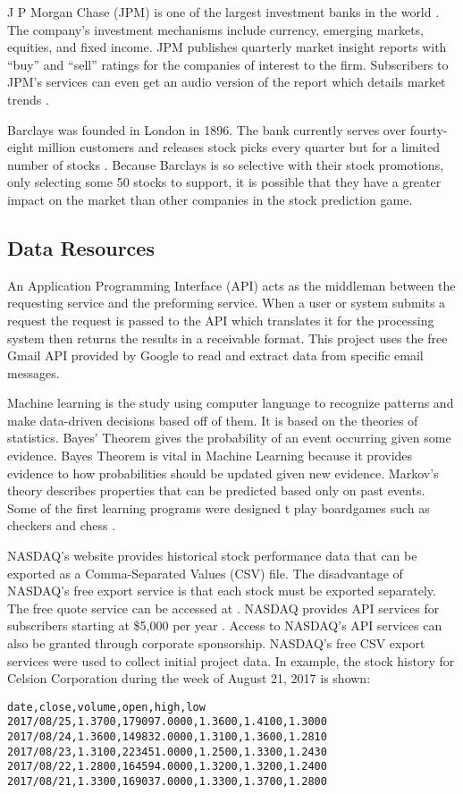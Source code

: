 \documentclass[sigconf]{acmart}
\begin{document}
J P Morgan Chase (JPM) is one of the largest investment banks in the world \cite{www-investBanks}. The company's investment mechanisms include currency, emerging markets, equities, and fixed income. JPM publishes quarterly market insight reports with ``buy'' and ``sell'' ratings for the companies of interest to the firm. Subscribers to JPM's services can even get an audio version of the report which details market trends \cite{www-JPM}.

Barclays was founded in London in 1896. The bank currently serves over fourty-eight million customers and releases stock picks every quarter but for a limited number of stocks \cite{www-investBanks}. Because Barclays is so selective with their stock promotions, only selecting some 50 stocks to support, it is possible that they have a greater impact on the market than other companies in the stock prediction game. 

\subsection{Data Resources}
An Application Programming Interface (API) acts as the middleman between the requesting service and the preforming service. When a user or system submits a request the request is passed to the API which translates it for the processing system then returns the results in a receivable format. This project uses the free Gmail API provided by Google to read and extract data from specific email messages.

Machine learning is the study using computer language to recognize patterns and make data-driven decisions based off of them. It is based on the theories of statistics. Bayes' Theorem gives the probability of an event occurring given some evidence. Bayes Theorem is vital in Machine Learning because it provides evidence to how probabilities should be updated given new evidence. Markov's theory describes properties that can be predicted based only on past events. Some of the first learning programs were designed t play boardgames such as checkers and chess \cite{www-wikiMachine}.

NASDAQ's website provides historical stock performance data that can be exported as a Comma-Separated Values (CSV) file. The disadvantage of NASDAQ's free export service is that each stock must be exported separately. The free quote service can be accessed at \cite{www-quotenasdaq}. NASDAQ provides API services for subscribers starting at \$5,000 per year \cite{www-nasdaq-sub}. Access to NASDAQ's API services can also be granted through corporate sponsorship. NASDAQ's free CSV export services were used to collect initial project data. In example, the stock history for Celsion Corporation during the week of August 21, 2017 is shown:
\begin{verbatim}
date,close,volume,open,high,low
2017/08/25,1.3700,179097.0000,1.3600,1.4100,1.3000
2017/08/24,1.3600,149832.0000,1.3100,1.3600,1.2810
2017/08/23,1.3100,223451.0000,1.2500,1.3300,1.2430
2017/08/22,1.2800,164594.0000,1.3200,1.3200,1.2400
2017/08/21,1.3300,169037.0000,1.3300,1.3700,1.2800
\end{verbatim}
\end{document}
